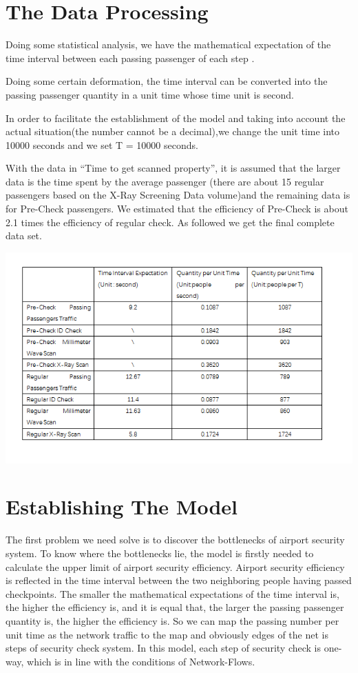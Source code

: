 \documentclass[12pt]{article}
\begin{document}
\section{The Data Processing}

\setlength{\parindent}{2em}
Doing some statistical analysis, we have the mathematical expectation of the time interval between each passing passenger of each step .





Doing some certain deformation, the time interval can be converted into the passing passenger quantity in a unit time whose time unit is second.




In order to facilitate the establishment of the model and taking into account the actual situation(the number cannot be a decimal),we change the unit time into 10000 seconds and we set T = 10000 seconds.




With the data in ``Time to get scanned property'', it is assumed that the larger data is the time spent by the average passenger (there are about 15 regular passengers based on the X-Ray Screening Data volume)and the remaining data is for Pre-Check passengers. We estimated that the efficiency of Pre-Check is about 2.1 times the efficiency of regular check. As followed we get the final complete data set.


\includegraphics[width=15cm]{p1.png}
\section{Establishing The Model}

\setlength{\parindent}{2em}
The first problem we need solve is to discover the bottlenecks of airport security system. To know where the bottlenecks lie, the model is firstly needed to calculate the upper limit of airport security efficiency. Airport security efficiency is reflected in the time interval between the two neighboring people having passed checkpoints. The smaller the mathematical expectations of the time interval is, the higher the efficiency is, and it is equal that, the larger the passing passenger quantity is, the higher the efficiency is. So we can map the passing number per unit time as the network traffic to the map and obviously edges of the net is steps of security check system. In this model, each step of security check is one-way, which is in line with the conditions of Network-Flows.
\end{document}
